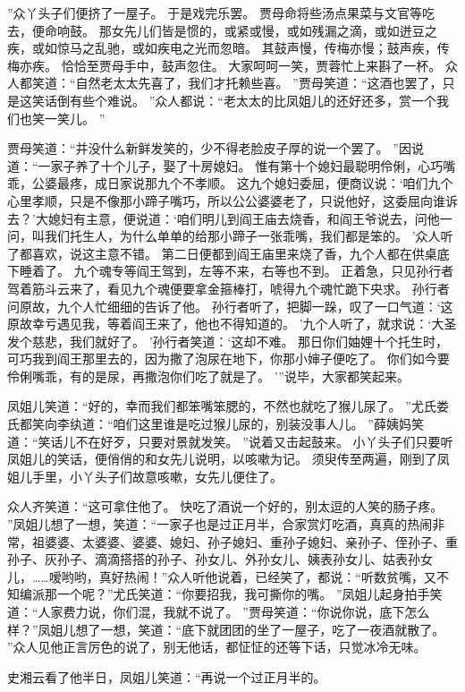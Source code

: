 ”众丫头子们便挤了一屋子。
于是戏完乐罢。
贾母命将些汤点果菜与文官等吃去，便命响鼓。
那女先儿们皆是惯的，或紧或慢，或如残漏之滴，或如迸豆之疾，或如惊马之乱驰，或如疾电之光而忽暗。
其鼓声慢，传梅亦慢；鼓声疾，传梅亦疾。
恰恰至贾母手中，鼓声忽住。
大家呵呵一笑，贾蓉忙上来斟了一杯。
众人都笑道：“自然老太太先喜了，我们才托赖些喜。
”贾母笑道：“这酒也罢了，只是这笑话倒有些个难说。
”众人都说：“老太太的比凤姐儿的还好还多，赏一个我们也笑一笑儿。
”\par
贾母笑道：“并没什么新鲜发笑的，少不得老脸皮子厚的说一个罢了。
”因说道：“一家子养了十个儿子，娶了十房媳妇。
惟有第十个媳妇最聪明伶俐，心巧嘴乖，公婆最疼，成日家说那九个不孝顺。
这九个媳妇委屈，便商议说：‘咱们九个心里孝顺，只是不像那小蹄子嘴巧，所以公公婆婆老了，只说他好，这委屈向谁诉去？’大媳妇有主意，便说道：‘咱们明儿到阎王庙去烧香，和阎王爷说去，问他一问，叫我们托生人，为什么单单的给那小蹄子一张乖嘴，我们都是笨的。
’众人听了都喜欢，说这主意不错。
第二日便都到阎王庙里来烧了香，九个人都在供桌底下睡着了。
九个魂专等阎王驾到，左等不来，右等也不到。
正着急，只见孙行者驾着筋斗云来了，看见九个魂便要拿金箍棒打，唬得九个魂忙跪下央求。
孙行者问原故，九个人忙细细的告诉了他。
孙行者听了，把脚一跺，叹了一口气道：‘这原故幸亏遇见我，等着阎王来了，他也不得知道的。
’九个人听了，就求说：‘大圣发个慈悲，我们就好了。
’孙行者笑道：‘这却不难。
那日你们妯娌十个托生时，可巧我到阎王那里去的，因为撒了泡尿在地下，你那小婶子便吃了。
你们如今要伶俐嘴乖，有的是尿，再撒泡你们吃了就是了。
’”说毕，大家都笑起来。
\par
凤姐儿笑道：“好的，幸而我们都笨嘴笨腮的，不然也就吃了猴儿尿了。
”尤氏娄氏都笑向李纨道：“咱们这里谁是吃过猴儿尿的，别装没事人儿。
”薛姨妈笑道：“笑话儿不在好歹，只要对景就发笑。
”说着又击起鼓来。
小丫头子们只要听凤姐儿的笑话，便俏俏的和女先儿说明，以咳嗽为记。
须臾传至两遍，刚到了凤姐儿手里，小丫头子们故意咳嗽，女先儿便住了。
\par
众人齐笑道：“这可拿住他了。
快吃了酒说一个好的，别太逗的人笑的肠子疼。
”凤姐儿想了一想，笑道：“一家子也是过正月半，合家赏灯吃酒，真真的热闹非常，祖婆婆、太婆婆、婆婆、媳妇、孙子媳妇、重孙子媳妇、亲孙子、侄孙子、重孙子、灰孙子、滴滴搭搭的孙子、孙女儿、外孙女儿、姨表孙女儿、姑表孙女儿，……嗳哟哟，真好热闹！”众人听他说着，已经笑了，都说：“听数贫嘴，又不知编派那一个呢？”尤氏笑道：“你要招我，我可撕你的嘴。
”凤姐儿起身拍手笑道：“人家费力说，你们混，我就不说了。
”贾母笑道：“你说你说，底下怎么样？”凤姐儿想了一想，笑道：“底下就团团的坐了一屋子，吃了一夜酒就散了。
”众人见他正言厉色的说了，别无他话，都怔怔的还等下话，只觉冰冷无味。
\par
史湘云看了他半日，凤姐儿笑道：“再说一个过正月半的。
